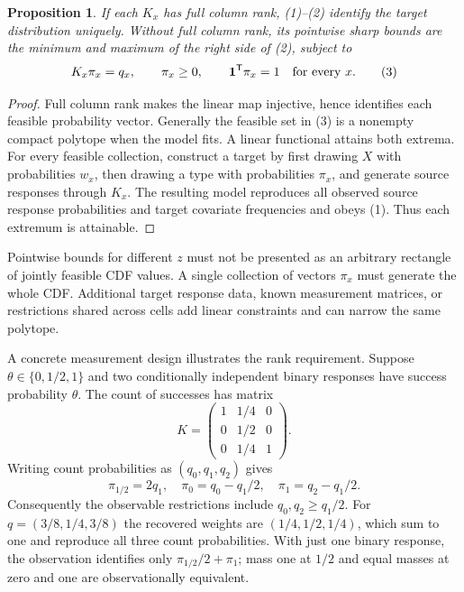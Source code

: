 \documentclass[11pt]{article}
\newtheorem{proposition}{Proposition}
\begin{document}
\begin{proposition}
If each $K_x$ has full column rank, (1)--(2) identify the target distribution
uniquely. Without full column rank, its pointwise sharp bounds are the
minimum and maximum of the right side of (2), subject to
\[
 K_x\pi_x=q_x,\qquad \pi_x\ge0,\qquad
 \mathbf1^\mathsf{T}\pi_x=1\quad\hbox{for every }x.        \tag{3}
\]
\end{proposition}
\begin{proof}
Full column rank makes the linear map injective, hence identifies each
feasible probability vector. Generally the feasible set in (3) is a
nonempty compact polytope when the model fits. A linear functional attains
both extrema. For every feasible collection, construct a target by first
drawing $X$ with probabilities $w_x$, then drawing a type with probabilities
$\pi_x$, and generate source responses through $K_x$. The resulting model
reproduces all observed source response probabilities and target covariate
frequencies and obeys (1). Thus each extremum is attainable.
\end{proof}

Pointwise bounds for different $z$ must not be presented as an arbitrary
rectangle of jointly feasible CDF values. A single collection of vectors
$\pi_x$ must generate the whole CDF. Additional target response data,
known measurement matrices, or restrictions shared across cells add linear
constraints and can narrow the same polytope.

A concrete measurement design illustrates the rank requirement. Suppose
$\theta\in\{0,1/2,1\}$ and two conditionally independent binary responses
have success probability $\theta$. The count of successes has matrix
\[
 K=\begin{pmatrix}1&1/4&0\\0&1/2&0\\0&1/4&1\end{pmatrix}.
\]
Writing count probabilities as $(q_0,q_1,q_2)$ gives
\[
 \pi_{1/2}=2q_1,\quad
 \pi_0=q_0-q_1/2,\quad \pi_1=q_2-q_1/2.                  \tag{4}
\]
Consequently the observable restrictions include
$q_0,q_2\ge q_1/2$. For $q=(3/8,1/4,3/8)$ the recovered weights are
$(1/4,1/2,1/4)$, which sum to one and reproduce all three count
probabilities. With just one binary response, the observation identifies
only $\pi_{1/2}/2+\pi_1$; mass one at $1/2$ and equal masses at zero and one
are observationally equivalent.
\end{document}
